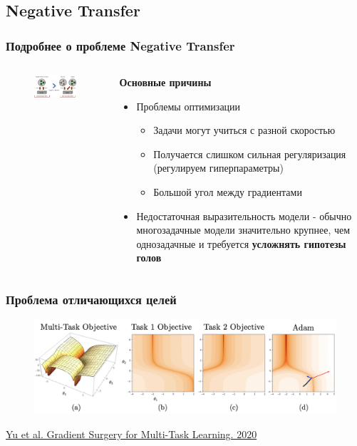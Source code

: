 \documentclass[aspectratio=169]{beamer}
\begin{document}
\subsection{Negative Transfer}

\begin{frame}
	\frametitle{Подробнее о проблеме Negative Transfer}
	\begin{columns}
		\begin{column}{0.5\textwidth}
			\begin{figure}
	       		\includegraphics[width=1\textwidth]{assets/nt.png}
	    	\end{figure}
		\end{column}
		\begin{column}{0.5\textwidth}
			\textbf{Основные причины}
			\begin{itemize}
				\item Проблемы оптимизации
				\begin{itemize}
					\item Задачи могут учиться с разной скоростью
					\item Получается слишком сильная регуляризация (регулируем гиперпараметры)
					\item Большой угол между градиентами
				\end{itemize}
				\item Недостаточная выразительность модели - обычно многозадачные модели значительно крупнее, чем однозадачные и требуется \textbf{усложнять гипотезы голов}
			\end{itemize}
		\end{column}
	\end{columns}
\end{frame}

\begin{frame}
	\frametitle{Проблема отличающихся целей}
	\begin{figure}
	    \includegraphics[width=1\textwidth]{assets/grad_angle.png}
	\end{figure}
	\href{https://arxiv.org/abs/2001.06782}{\color {blue} Yu et al. Gradient Surgery for Multi-Task Learning. 2020}
\end{frame}
\end{document}
